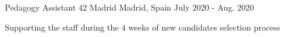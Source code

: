 

\begin{cventries}

  \cventry
    {Pedagogy Assistant} %
    {42 Madrid} %
    {Madrid, Spain} %
    {July 2020 - Aug. 2020} %
    {
      \begin{cvitems} %
        \item {Supporting the staff during the 4 weeks of new candidates selection process}
      \end{cvitems}
    }
\end{cventries}

